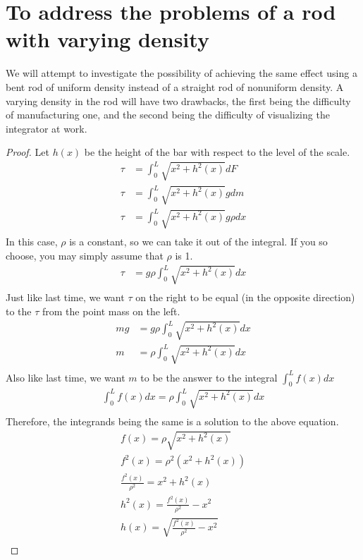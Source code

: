 \documentclass[letterpaper, 12pt]{article}
\begin{document}
\section{To address the problems of a rod with varying density}
We will attempt to investigate the possibility of achieving the same effect using a bent rod of uniform density instead of a straight rod of nonuniform density.
A varying density in the rod will have two drawbacks, the first being the difficulty of manufacturing one, and the second being the difficulty of visualizing the integrator at work.
\begin{center}
\end{center}
\begin{proof}
	Let $h(x)$ be the height of the bar with respect to the level of the scale.
	\begin{align*}
		\tau &= \int_0^L \sqrt{x^2 + h^2(x)}dF\\
		\tau &= \int_0^L \sqrt{x^2 + h^2(x)}gdm\\
		\tau &= \int_0^L \sqrt{x^2 + h^2(x)}g\rho dx\\
	\end{align*}
	In this case, $\rho$ is a constant, so we can take it out of the integral.
	If you so choose, you may simply assume that $\rho$ is 1.
	\begin{align*}
		\tau &= g\rho\int_0^L \sqrt{x^2 + h^2(x)}dx\\
	\end{align*}
	Just like last time, we want $\tau$ on the right to be equal (in the opposite direction) to the $\tau$ from the point mass on the left.
	\begin{align*}
		mg &= g\rho\int_0^L \sqrt{x^2 + h^2(x)}dx\\
		m &= \rho\int_0^L \sqrt{x^2 + h^2(x)}dx\\
	\end{align*}
	Also like last time, we want $m$ to be the answer to the integral $\int_0^L f(x) dx$
	\begin{align*}
		\int_0^L f(x) dx = \rho\int_0^L \sqrt{x^2 + h^2(x)}dx\\
	\end{align*}
	Therefore, the integrands being the same is a solution to the above equation.
	\begin{align*}
		f(x) = \rho\sqrt{x^2 + h^2(x)}\\
		f^2(x) = \rho^2(x^2 + h^2(x))\\
		\frac{f^2(x)}{\rho^2} = x^2 + h^2(x)\\
		h^2(x) = \frac{f^2(x)}{\rho^2} - x^2\\
		h(x) = \sqrt{\frac{f^2(x)}{\rho^2} - x^2}\\
	\end{align*}
\end{proof}
\end{document}
